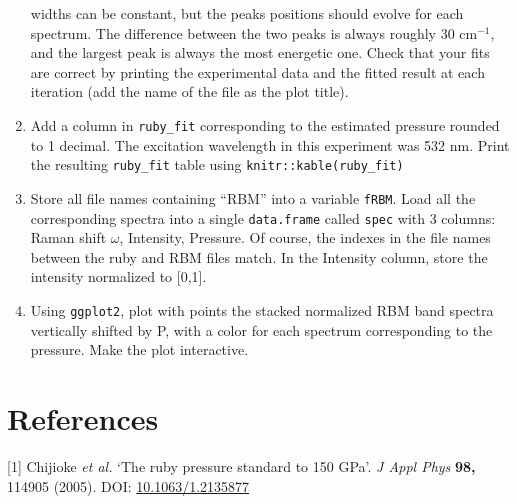 \documentclass[]{article}
\begin{document}
\begin{enumerate}
  widths can be constant, but the peaks positions should evolve for each
  spectrum. The difference between the two peaks is always roughly 30
  cm\(^{-1}\), and the largest peak is always the most energetic one.
  Check that your fits are correct by printing the experimental data and
  the fitted result at each iteration (add the name of the file as the
  plot title).
\item
  Add a column in \texttt{ruby\_fit} corresponding to the estimated
  pressure rounded to 1 decimal. The excitation wavelength in this
  experiment was 532 nm. Print the resulting \texttt{ruby\_fit} table
  using \texttt{knitr::kable(ruby\_fit)}
\item
  Store all file names containing ``RBM'' into a variable \texttt{fRBM}.
  Load all the corresponding spectra into a single \texttt{data.frame}
  called \texttt{spec} with 3 columns: Raman shift \(\omega\),
  Intensity, Pressure. Of course, the indexes in the file names between
  the ruby and RBM files match. In the Intensity column, store the
  intensity normalized to {[}0,1{]}.
\item
  Using \texttt{ggplot2}, plot with points the stacked normalized RBM
  band spectra vertically shifted by P, with a color for each spectrum
  corresponding to the pressure. Make the plot interactive.
\end{enumerate}

\hypertarget{references}{%
\section*{References}\label{references}}

\hypertarget{refs}{}
\leavevmode\hypertarget{ref-Chijioke2005}{}%
{[}1{]} Chijioke \emph{et al.} `The ruby pressure standard to 150 GPa'.
\emph{J Appl Phys} \textbf{98,} 114905 (2005). DOI:
\href{https://doi.org/10.1063/1.2135877}{10.1063/1.2135877}
\end{document}
